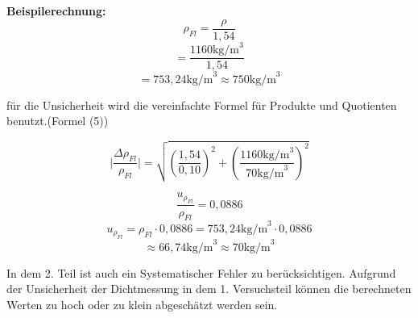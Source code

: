 \documentclass[11pt,a4paper]{article} %
\begin{document}
\begin{tcolorbox}[colback=white]
	\textbf{Beispilerechnung:}
$$\rho_{Fl}=\frac{\rho}{1,54}$$
$$=\frac{1160 \textrm{kg/m}^3 }{1,54}$$
$$=753,24 \textrm{kg/m}^3\approx 750 \textrm{kg/m}^3$$

für die Unsicherheit wird die vereinfachte Formel für Produkte und Quotienten benutzt.(Formel (5))


$$\vert\frac{\Delta{\rho_{Fl}}}{\rho_{Fl}}\vert = \sqrt{(\frac{1,54}{0,10})^2+(\frac{1160 \textrm{kg/m}^3}{70\textrm{kg/m}^3})^2}$$

$$\frac{u_{\rho_{Fl}}}{\rho_{Fl}} = 0,0886$$
$$u_{\rho_{Fl}}={\rho_{Fl}}\cdot0,0886=753,24\textrm{kg/m}^3\cdot0,0886$$
$$\approx66,74\textrm{kg/m}^3\approx70\textrm{kg/m}^3$$
\end{tcolorbox}


In dem 2. Teil ist auch ein Systematischer Fehler zu berücksichtigen. Aufgrund der Unsicherheit der Dichtmessung in dem 1. Versuchsteil können die berechneten Werten zu hoch oder zu klein abgeschätzt werden sein. 
\end{document}
